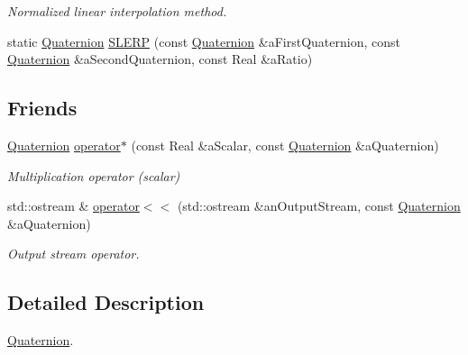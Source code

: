 \begin{DoxyCompactItemize}
\begin{DoxyCompactList}\small\item\em Normalized linear interpolation method. \end{DoxyCompactList}\item 
static \hyperlink{classostk_1_1math_1_1geom_1_1d3_1_1trf_1_1rot_1_1_quaternion}{Quaternion} \hyperlink{classostk_1_1math_1_1geom_1_1d3_1_1trf_1_1rot_1_1_quaternion_abb665a14367c406cf7e5c88824195186}{S\+L\+E\+RP} (const \hyperlink{classostk_1_1math_1_1geom_1_1d3_1_1trf_1_1rot_1_1_quaternion}{Quaternion} \&a\+First\+Quaternion, const \hyperlink{classostk_1_1math_1_1geom_1_1d3_1_1trf_1_1rot_1_1_quaternion}{Quaternion} \&a\+Second\+Quaternion, const Real \&a\+Ratio)
\end{DoxyCompactItemize}
\subsection*{Friends}
\begin{DoxyCompactItemize}
\item 
\hyperlink{classostk_1_1math_1_1geom_1_1d3_1_1trf_1_1rot_1_1_quaternion}{Quaternion} \hyperlink{classostk_1_1math_1_1geom_1_1d3_1_1trf_1_1rot_1_1_quaternion_a2806bc2f5b9d299c075c51740cfa48ea}{operator$\ast$} (const Real \&a\+Scalar, const \hyperlink{classostk_1_1math_1_1geom_1_1d3_1_1trf_1_1rot_1_1_quaternion}{Quaternion} \&a\+Quaternion)
\begin{DoxyCompactList}\small\item\em Multiplication operator (scalar) \end{DoxyCompactList}\item 
std\+::ostream \& \hyperlink{classostk_1_1math_1_1geom_1_1d3_1_1trf_1_1rot_1_1_quaternion_ab9414dc117f260055d0a1a565eb93708}{operator$<$$<$} (std\+::ostream \&an\+Output\+Stream, const \hyperlink{classostk_1_1math_1_1geom_1_1d3_1_1trf_1_1rot_1_1_quaternion}{Quaternion} \&a\+Quaternion)
\begin{DoxyCompactList}\small\item\em Output stream operator. \end{DoxyCompactList}\end{DoxyCompactItemize}


\subsection{Detailed Description}
\hyperlink{classostk_1_1math_1_1geom_1_1d3_1_1trf_1_1rot_1_1_quaternion}{Quaternion}. 

